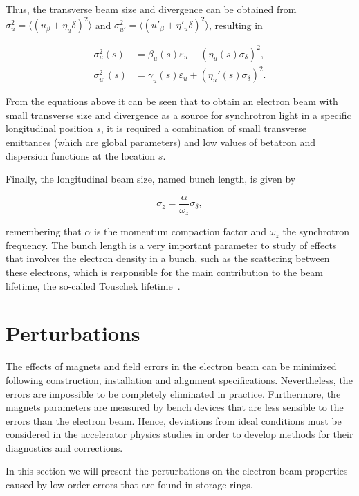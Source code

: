 Thus, the transverse beam size and divergence can be obtained from $\sigma^2_u = \langle\left(u_\beta + \eta_u \delta\right)^2\rangle$ and $\sigma^2_{u'} = \langle\left(u'_\beta + \eta'_u \delta\right)^2\rangle$, resulting in

\begin{align}
 \sigma^2_u(s) &= \beta_u (s) \varepsilon_u + \left(\eta_u(s) \sigma_{\delta}\right)^2, \\
 \sigma^2_{u'}(s) &= \gamma_u (s) \varepsilon_u + \left(\eta_{u}'(s) \sigma_{\delta}\right)^2.
\end{align}

From the equations above it can be seen that to obtain an electron beam with small transverse size and divergence as a source for synchrotron light in a specific longitudinal position $s$, it is required a combination of small transverse emittances (which are global parameters) and low values of betatron and dispersion functions at the location $s$.

Finally, the longitudinal beam size, named bunch length, is given by

\begin{equation}
    \sigma_{z} = \dfrac{\alpha}{\omega_z} \sigma_{\delta},
\end{equation}

remembering that $\alpha$ is the momentum compaction factor and $\omega_z$ the synchrotron frequency. The bunch length is a very important parameter to study of effects that involves the electron density in a bunch, such as the scattering between these electrons, which is responsible for the main contribution to the beam lifetime, the so-called Touschek lifetime~\cite{touschek}.

\section{Perturbations}\label{perturbations}

The effects of magnets and field errors in the electron beam can be minimized following construction, installation and alignment specifications. Nevertheless, the errors are impossible to be completely eliminated in practice. Furthermore, the magnets parameters are measured by bench devices that are less sensible to the errors than the electron beam. Hence, deviations from ideal conditions must be considered in the accelerator physics studies in order to develop methods for their diagnostics and corrections.

In this section we will present the perturbations on the electron beam properties caused by low-order errors that are found in storage rings. 

